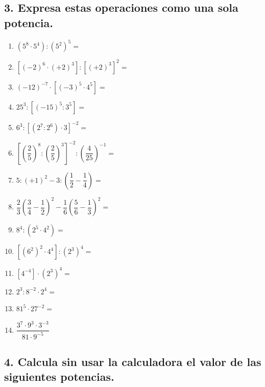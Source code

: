 \documentclass[a4paper,12pt]{article}
\begin{document}
\vspace{0.5cm}

\subsection*{3. Expresa estas operaciones como una sola potencia.}

\begin{enumerate}[label=\alph*.]
    \item $(5^{8} \cdot 5^{4}) : (5^{2})^{5} =$
    \item $[(-2)^{6} \cdot (+2)^{3}] : [(+2)^{3}]^{2} =$
    \item $(-12)^{-7} \cdot [(-3)^{5} \cdot 4^{5}] =$
    \item $25^{3} : [(-15)^{5} : 3^{5}] =$
    \item $6^{3} : [(2^{7} : 2^{6}) \cdot 3]^{-2} =$
    \item $\left[\left(\dfrac{2}{5}\right)^{8} : \left(\dfrac{2}{5}\right)^{3}\right]^{-2} : \left(\dfrac{4}{25}\right)^{-1} =$
    \item $5 : (+1)^{2} - 3 : \left(\dfrac{1}{2} - \dfrac{1}{4}\right) =$
    \item $\dfrac{2}{3}\left(\dfrac{3}{4} - \dfrac{1}{2}\right)^{2} - \dfrac{1}{6}\left(\dfrac{5}{6} - \dfrac{1}{3}\right)^{2} =$
    \item $8^{4} : (2^{5} \cdot 4^{2}) =$
    \item $[(6^{2})^{2} \cdot 4^{4}] : (2^{3})^{4} =$
    \item $[4^{-4}] \cdot (2^{3})^{4} =$
    \item $2^{3} : 8^{-2} \cdot 2^{4} =$
    \item $81^{5} \cdot 27^{-2} =$
    \item $\dfrac{3^{7} \cdot 9^{3} \cdot 3^{-3}}{81 \cdot 9^{-5}}$
\end{enumerate}

\subsection*{4. Calcula sin usar la calculadora el valor de las siguientes potencias.}
\end{document}
